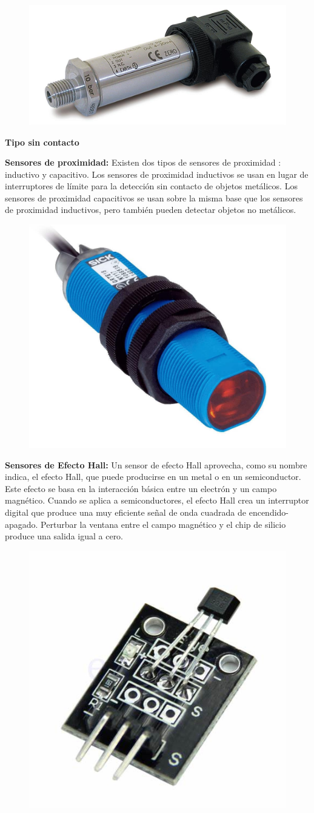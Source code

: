 \begin{figure}[h]
	\centering
	\includegraphics[width=0.4\linewidth, height=0.2\textwidth]{img/transductorpresion}
	\caption{}
	\label{fig:transductorpresion}
\end{figure} 

\textbf{Tipo sin contacto }

\textbf{Sensores de proximidad: }
Existen dos tipos de sensores de proximidad : inductivo y capacitivo. Los sensores de proximidad inductivos se usan en lugar de interruptores de límite para la detección sin contacto de objetos metálicos. Los sensores de proximidad capacitivos se usan sobre la misma base que los sensores de proximidad inductivos, pero también pueden detectar objetos no metálicos.



\begin{figure}[h]
	\centering
	\includegraphics[width=0.4\linewidth, height=0.2\textwidth]{img/proximidad}
	\caption{}
	\label{fig:proximidad}
\end{figure} 

\textbf{Sensores de Efecto Hall: }
Un sensor de efecto Hall aprovecha, como su nombre indica, el efecto Hall, que puede producirse en un metal o en un semiconductor. Este efecto se basa en la interacción básica entre un electrón y un campo magnético. Cuando se aplica a semiconductores, el efecto Hall crea un interruptor digital que produce una muy eficiente señal de onda cuadrada de encendido-apagado. Perturbar la ventana entre el campo magnético y el chip de silicio produce una salida igual a cero.



\begin{figure}[h]
	\centering
	\includegraphics[width=0.4\linewidth, height=0.2\textwidth]{img/HALL}
	\caption{}
	\label{fig:HALL}
\end{figure} 

